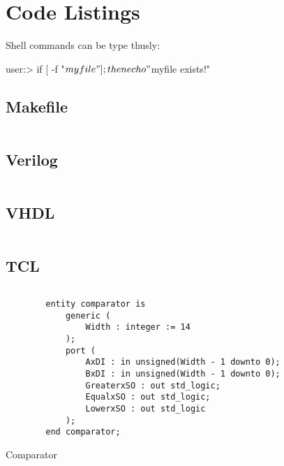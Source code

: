 \documentclass[a4paper,oneside]{alpenthesis/alpenthesis}
\begin{document}

\chapter{Code Listings}
\label{ch:Code_Listings}

Shell commands can be type thusly:
\begin{commandshell}
    user:> if [ -f "${myfile}" ];then echo "${myfile} exists!"
\end{commandshell}

\section{Makefile}
\begin{tcolorbox}[
        breakable,
        title={
            \refstepcounter{listing}
            Listing \thelisting: Makefile Code
            \label{lst:makefile}
            \addcontentsline{lol}{listing}{\protect\numberline{\thelisting}Makefile Code}
        }
    ]
    \inputminted{makefile}{code/Makefile}
\end{tcolorbox}

\section{Verilog}
\begin{tcolorbox}[
        breakable,
        width=1.2\textwidth,
        title={
            \refstepcounter{listing}
            Listing \thelisting: Verilog Code
            \label{lst:makefile}
            \addcontentsline{lol}{listing}{\protect\numberline{\thelisting}Verilog Code}
        }
    ]
\inputminted{verilog}{./code/axi_axis_reader.v}
\end{tcolorbox}

\section{VHDL}
\inputminted{vhdl}{./code/comparator.vhd}

\section{TCL}
\inputminted{tcl}{./code/create_cores.tcl}

\begin{listing}
    \begin{verbatim}
        entity comparator is
            generic (
                Width : integer := 14
            );
            port (
                AxDI : in unsigned(Width - 1 downto 0);
                BxDI : in unsigned(Width - 1 downto 0);
                GreaterxSO : out std_logic;
                EqualxSO : out std_logic;
                LowerxSO : out std_logic
            );
        end comparator;
    \end{verbatim}
    \caption{Comparator}
    \label{lst:vhdl:comparator}
\end{listing}
\end{document}
